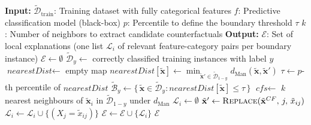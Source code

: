 \begin{algorithm}[H]
  \caption{Adapted BoCSoR for Categorical Data}\label{alg:bocsor-adapted}
  \begin{algorithmic}[1]
    \Statex \textbf{Input:}
    \Statex \quad $\widetilde{\mathcal{D}}_{\mathrm{train}}$: Training dataset with fully categorical features
    \Statex \quad $f$: Predictive classification model (black-box)
    \Statex \quad $p$: Percentile to define the boundary threshold $\tau$
    \Statex \quad $k$: Number of neighbors to extract candidate counterfactuals
    \Statex \textbf{Output:}
    \Statex \quad $\mathcal{E}$: Set of local explanations (one list $\mathcal{L}_i$ of relevant feature-category pairs per boundary instance)
      \State $\mathcal{E} \gets \emptyset$ 
        \State $\widetilde{\mathcal{D}}_y \gets$ correctly classified training instances with label $y$
        \State $\textit{nearestDist} \gets$ empty map 
          \State $\textit{nearestDist}[\tilde{\mathbf{x}}] \gets \min_{\tilde{\mathbf{x}}' \in \widetilde{\mathcal{D}}_{1-y}} d_{\mathrm{Man}}(\tilde{\mathbf{x}}, \tilde{\mathbf{x}}')$ 
        \EndFor
        \State $\tau \gets p$-th percentile of $\textit{nearestDist}$ 
        \State $\widetilde{\mathcal{B}}_y \gets \{\, \tilde{\mathbf{x}} \in \widetilde{\mathcal{D}}_y : \textit{nearestDist}[\tilde{\mathbf{x}}] \leq \tau \,\}$ 
          \State $\textit{cfs} \gets$ $k$ nearest neighbours of $\tilde{\mathbf{x}}_i$ in $\widetilde{\mathcal{D}}_{1-y}$ under $d_{\mathrm{Man}}$ 
          \State $\mathcal{L}_i \gets \emptyset$ 
              \State $\tilde{\mathbf{x}}' \gets \Call{Replace}{\tilde{\mathbf{x}}^{CF},\, j,\, \tilde{x}_{ij}}$ 
               
                \State $\mathcal{L}_i \gets \mathcal{L}_i \cup \{(X_j = \tilde{x}_{ij})\}$ 
              \EndIf
            \EndFor
          \EndFor
          \State $\mathcal{E} \gets \mathcal{E} \cup \{\mathcal{L}_i\}$ 
        \EndFor
      \EndFor
      \State \Return $\mathcal{E}$
    \EndProcedure
  \end{algorithmic}
\end{algorithm}

